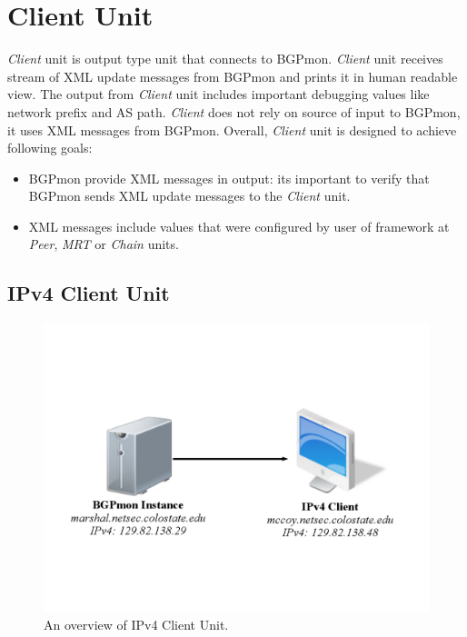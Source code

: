 \section{Client Unit}
\label{sec:client}


\emph{Client} unit is output type unit that connects to BGPmon. \emph{Client} unit receives stream of XML  update messages from BGPmon and prints it in human readable view. The output from \emph{Client} unit includes important debugging values like network prefix and AS path.  \emph{Client} does not rely on source of input to BGPmon, it uses XML messages from BGPmon. Overall, \emph{Client} unit is designed to achieve following goals:

\begin{itemize}
\item{BGPmon provide XML messages in output: its important to verify that BGPmon sends XML update messages to the \emph{Client} unit.}
\item{XML messages include values that were configured by user of framework at \emph{Peer}, \emph{MRT} or \emph{Chain} units.}
\end{itemize}


\subsection{IPv4 Client Unit}

\begin{figure}
\centering
\includegraphics[scale=0.30]{figs/ipv4-client.png}
\caption{An overview of IPv4 Client Unit.}
\label{clientfig}
\end{figure}

